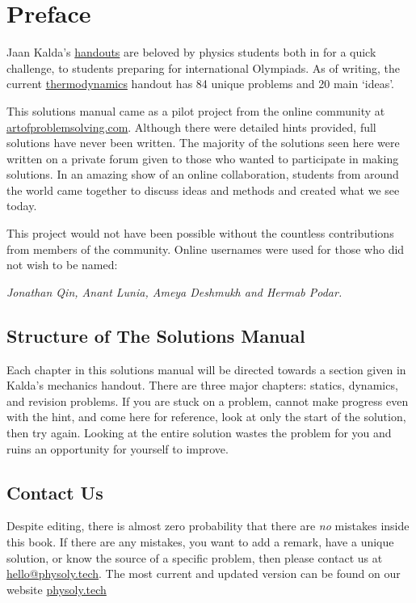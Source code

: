 \documentclass[11pt]{article}
\begin{document}
\section*{Preface}
\vspace{-5mm}
\indent Jaan Kalda's \href{https://www.ioc.ee/~kalda/ipho/}{handouts} are beloved by physics students both in for a quick challenge, to students preparing for international Olympiads. As of writing, the current \href{https://www.ioc.ee/~kalda/ipho/Thermodyn.pdf}{thermodynamics} handout has 84 unique problems and 20 main `ideas'.

This solutions manual came as a pilot project from the online community at \url{artofproblemsolving.com}. Although there were detailed hints provided, full solutions have never been written. The majority of the solutions seen here were written on a private forum given to those who wanted to participate in making solutions. In an amazing show of an online collaboration, students from around the world came together to discuss ideas and methods and created what we see today.

This project would not have been possible without the countless contributions from members of the community. Online usernames were used for those who did not wish to be named: 

\textit{Jonathan Qin, Anant Lunia, Ameya Deshmukh and Hermab Podar.}
\subsection*{Structure of The Solutions Manual}
\vspace{-5mm}
Each chapter in this solutions manual will be directed towards a section given in Kalda's mechanics handout. There are three major chapters: statics, dynamics, and revision problems. If you are stuck on a problem, cannot make progress even with the hint, and come here for reference, look at only the start of the solution, then try again. Looking at the entire solution wastes the problem for you and ruins an opportunity for yourself to improve.

\subsection*{Contact Us}
\vspace{-5mm}
Despite editing, there is almost zero probability that there are \textit{no} mistakes inside this book. If there are any mistakes, you want to add a remark, have a unique solution, or know the source of a specific problem, then please contact us at \url{hello@physoly.tech}. The most current and updated version can be found on our website \url{physoly.tech}
\end{document}
